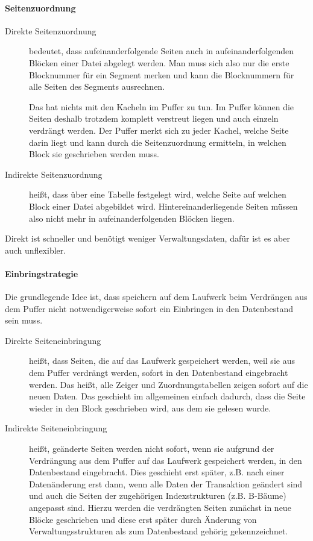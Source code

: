 \begin{enumerate}[a)]
\begin{solution}
	\paragraph{Seitenzuordnung}
	\begin{description}
		\item[Direkte Seitenzuordnung] bedeutet, dass aufeinanderfolgende Seiten auch in aufeinanderfolgenden Blöcken einer Datei abgelegt werden. Man muss sich also nur die erste Blocknummer für ein Segment merken und kann die Blocknummern für alle Seiten des Segments ausrechnen.

		Das hat nichts mit den Kacheln im Puffer zu tun. Im Puffer können die Seiten deshalb trotzdem komplett verstreut liegen und auch einzeln verdrängt werden. Der Puffer merkt sich zu jeder Kachel, welche Seite darin liegt und kann durch die Seitenzuordnung ermitteln, in welchen Block sie geschrieben werden muss.

		\item[Indirekte Seitenzuordnung] heißt, dass über eine Tabelle festgelegt wird, welche Seite auf welchen Block einer Datei abgebildet wird. Hintereinanderliegende Seiten müssen also nicht mehr in aufeinanderfolgenden Blöcken liegen.
	\end{description}

	Direkt ist schneller und benötigt weniger Verwaltungsdaten, dafür ist es aber auch unflexibler.

	\paragraph{Einbringstrategie}
	Die grundlegende Idee ist, dass speichern auf dem Laufwerk beim Verdrängen aus dem Puffer nicht notwendigerweise sofort ein Einbringen in den Datenbestand sein muss.

	\begin{description}
		\item[Direkte Seiteneinbringung] heißt, dass Seiten, die auf das Laufwerk gespeichert werden, weil sie aus dem Puffer verdrängt werden, sofort in den Datenbestand eingebracht werden. Das heißt, alle Zeiger und Zuordnungstabellen zeigen sofort auf die neuen Daten. Das geschieht im allgemeinen einfach dadurch, dass die Seite wieder in den Block geschrieben wird, aus dem sie gelesen wurde.
		\item[Indirekte Seiteneinbringung] heißt, geänderte Seiten werden nicht sofort, wenn sie aufgrund der Verdrängung aus dem Puffer auf das Laufwerk gespeichert werden, in den Datenbestand eingebracht. Dies geschieht erst später, z.B. nach einer Datenänderung erst dann, wenn alle Daten der Transaktion geändert sind und auch die Seiten der zugehörigen Indexstrukturen (z.B. B-Bäume) angepasst sind. Hierzu werden die verdrängten Seiten zunächst in neue Blöcke geschrieben und diese erst später durch Änderung von Verwaltungsstrukturen als zum Datenbestand gehörig gekennzeichnet.
	\end{description}


\end{solution}
\end{enumerate}
